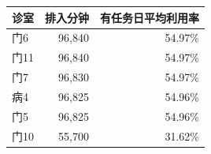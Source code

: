 \begin{tabular}{lrr}
\toprule
诊室 & 排入分钟 & 有任务日平均利用率 \\
\midrule
门6 & 96,840 & 54.97\% \\
门11 & 96,840 & 54.97\% \\
门7 & 96,830 & 54.97\% \\
病4 & 96,825 & 54.96\% \\
门5 & 96,825 & 54.96\% \\
门10 & 55,700 & 31.62\% \\
\bottomrule
\end{tabular}
